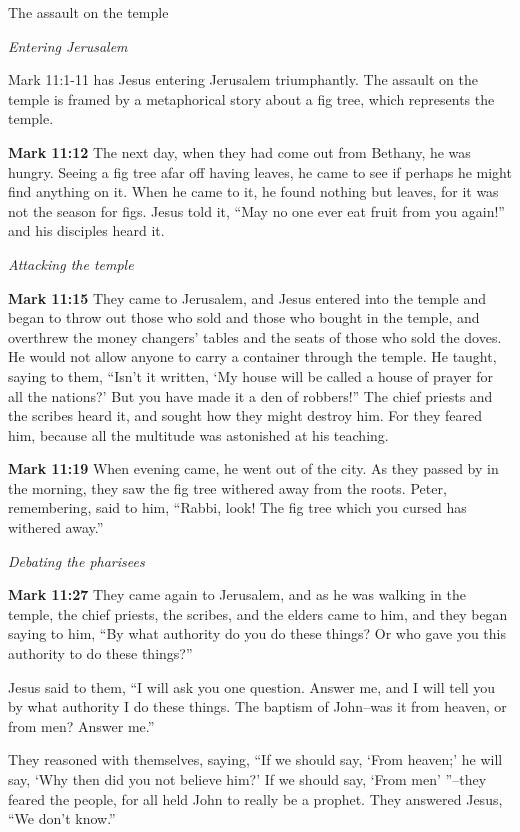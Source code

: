 \documentclass[10pt,twoside]{article} %
\newcommand{\quotesize}{\normalsize{}}
\newcommand{\comm}[1]{\begingroup \color{black!50} #1\endgroup}
\newenvironment{quotetext}{\begingroup\quotesize}{\endgroup}
\newcommand{\bible}[2]{\begin{quotetext}\textbf{#1} #2\end{quotetext}}
\newcommand{\gospelmark}[2]{\bible{Mark #1}{#2}}
\newcommand{\subhead}[1]{\emph{#1}\par}
\begin{document}
\begin{section}{The assault on the temple}

\subhead{Entering Jerusalem}

\comm{Mark 11:1-11 has Jesus entering Jerusalem triumphantly. The assault on the temple is framed by
a metaphorical story about a fig tree, which represents the temple.}

\gospelmark{11:12}{ The next day, when they had come out from Bethany, he was hungry.   Seeing a fig tree afar off having leaves, he came to see if perhaps he might find anything on it. When he came to it, he found nothing but leaves, for it was not the season for figs.   Jesus told it, ``May no one ever eat fruit from you again!'' and his disciples heard it. }

\subhead{Attacking the temple}

\gospelmark{11:15}{
They came to Jerusalem, and Jesus entered into the temple and began to throw out those who sold and those who bought in the temple, and overthrew the money changers' tables and the seats of those who sold the doves.   He would not allow anyone to carry a container through the temple.   He taught, saying to them, ``Isn't it written, `My house will be called a house of prayer for all the nations?' But you have made it a den of robbers!''
  The chief priests and the scribes heard it, and sought how they might destroy him. For they feared him, because all the multitude was astonished at his teaching. 
}

\gospelmark{11:19}{
When evening came, he went out of the city.   As they passed by in the morning, they saw the fig tree withered away from the roots.   Peter, remembering, said to him, ``Rabbi, look! The fig tree which you cursed has withered away.''
}

\subhead{Debating the pharisees}

\gospelmark{11:27}{
They came again to Jerusalem, and as he was walking in the temple, the chief priests, the scribes, and the elders came to him,   and they began saying to him, ``By what authority do you do these things? Or who gave you this authority to do these things?''

  Jesus said to them, ``I will ask you one question. Answer me, and I will tell you by what authority I do these things.    The baptism of John--was it from heaven, or from men? Answer me.''

  They reasoned with themselves, saying, ``If we should say, `From heaven;' he will say, `Why then did you not believe him?'   If we should say, `From men' ''--they feared the people, for all held John to really be a prophet.   They answered Jesus, ``We don't know.''

}
\end{section}
\end{document}
